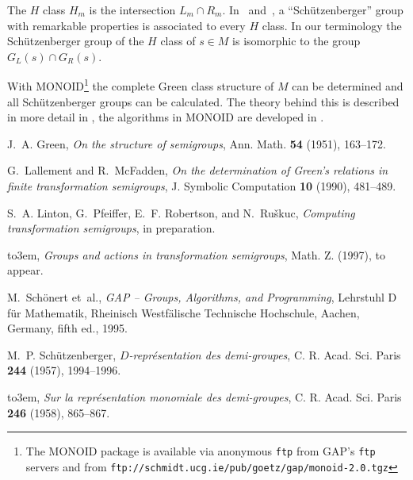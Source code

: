 \documentclass[12pt]{amsart}
\newcommand{\GAP}{\textsf{GAP}}
\newcommand{\MONOID}{\textsf{MONOID}}
\begin{document}
The  $H$ class  $H_m$ is  the intersection $L_m   \cap  R_m$.  In~\cite{sc57}
and~\cite{sc58}, a  ``Sch\"utzenberger'' group  with remarkable properties is
associated to every $H$ class.  In our terminology the Sch\"utzenberger group
of the  $H$  class of $s \in   M$  is isomorphic  to the  group  $G_L(s) \cap
G_R(s)$.

With {\MONOID}\footnote{The   {\MONOID} package   is available  via anonymous
  \texttt{ftp}     from     {\GAP}'s     \texttt{ftp}  servers    and    from
  \texttt{ftp://schmidt.ucg.ie/pub/goetz/gap/monoid-2.0.tgz}}    the complete
Green  class  structure of  $M$  can be  determined  and all Sch\"utzenberger
groups can be calculated.  The theory behind this is described in more detail
in \cite{LPRR1}, the algorithms in {\MONOID} are developed in \cite{LPRR2}.

%
%

\providecommand{\bysame}{\leavevmode\hbox to3em{\hrulefill}\thinspace}
\begin{thebibliography}{1}

J.~A. Green, \emph{On the structure of semigroups}, Ann. Math. \textbf{54}
  (1951), 163--172.

G.~Lallement and R.~McFadden, \emph{On the determination of {Green}'s relations
  in finite transformation semigroups}, J. Symbolic Computation \textbf{10}
  (1990), 481--489.

S.~A. Linton, G.~Pfeiffer, E.~F. Robertson, and N.~Ru{\v s}kuc, \emph{Computing
  transformation semigroups}, in preparation.

\bysame, \emph{Groups and actions in transformation semigroups}, Math. Z.
  (1997), to appear.

M.~Sch{\"o}nert et~al., \emph{{GAP} -- {Groups}, {Algorithms}, and
  {Programming}}, Lehrstuhl D f{\"u}r Mathematik, Rheinisch Westf{\"a}lische
  Technische Hoch\-schule, Aachen, Germany, fifth ed., 1995.

M.~P. Sch{\"u}tzenberger, \emph{{$D$}-repr{\'e}sentation des demi-groupes}, C.
  R. Acad. Sci. Paris \textbf{244} (1957), 1994--1996.

\bysame, \emph{Sur la repr{\'e}sentation monomiale des demi-groupes}, C. R.
  Acad. Sci. Paris \textbf{246} (1958), 865--867.

\end{thebibliography}
\end{document}
